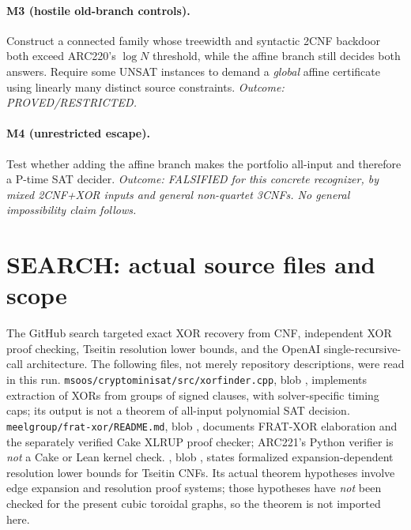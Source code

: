 \documentclass[11pt]{article}
\begin{document}
\paragraph{M3 (hostile old-branch controls).} Construct a connected family
whose treewidth and syntactic 2CNF backdoor both exceed ARC220's $\log N$
threshold, while the affine branch still decides both answers.  Require some
UNSAT instances to demand a \emph{global} affine certificate using linearly
many distinct source constraints.  \emph{Outcome: PROVED/RESTRICTED.}
\paragraph{M4 (unrestricted escape).} Test whether adding the affine branch
makes the portfolio all-input and therefore a P-time SAT decider.
\emph{Outcome: FALSIFIED for this concrete recognizer, by mixed
2CNF+XOR inputs and general non-quartet 3CNFs.  No general impossibility
claim follows.}

\section{SEARCH: actual source files and scope}
The GitHub search targeted exact XOR recovery from CNF, independent XOR proof
checking, Tseitin resolution lower bounds, and the OpenAI single-recursive-call
architecture.  The following files, not merely repository descriptions, were
read in this run.  \texttt{msoos/cryptominisat/src/xorfinder.cpp}, blob
{\ttfamily{}}, implements extraction
of XORs from groups of signed clauses, with solver-specific timing caps;
its output is not a theorem of all-input polynomial SAT decision.
\texttt{meelgroup/frat-xor/README.md}, blob
{\ttfamily{}}, documents
FRAT-XOR elaboration and the separately verified Cake XLRUP proof checker;
ARC221's Python verifier is \emph{not} a Cake or Lean kernel check.
,
blob {\ttfamily{}}, states
formalized expansion-dependent resolution lower bounds for Tseitin CNFs.
Its actual theorem hypotheses involve edge expansion and resolution proof
systems; those hypotheses have \emph{not} been checked for the present
cubic toroidal graphs, so the theorem is not imported here.
\end{document}
